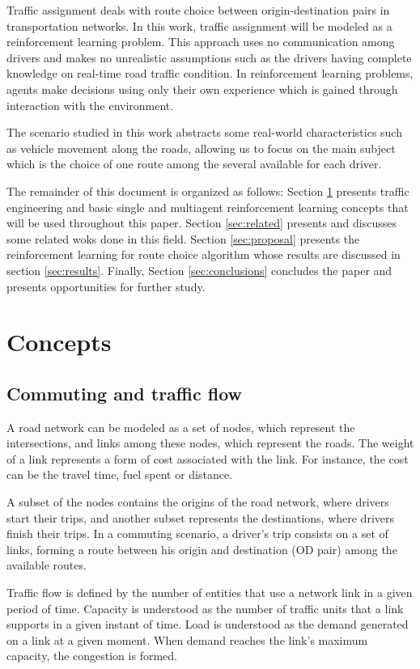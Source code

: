 \documentclass[12pt]{article}
\begin{document}
Traffic assignment deals with route choice between origin-destination pairs in transportation networks. In this work, traffic assignment will be modeled as a reinforcement learning problem. This approach uses no communication among drivers and makes no unrealistic assumptions such as the drivers having complete knowledge on real-time road traffic condition. In reinforcement learning problems, agents make decisions using only their own experience which is gained through interaction with the environment.

The scenario studied in this work abstracts some real-world characteristics such as vehicle movement along the roads, allowing us to focus on the main subject which is the choice of one route among the several available for each driver.

The remainder of this document is organized as follows: Section \ref{sec:concepts} presents traffic engineering and basic single and multiagent reinforcement learning concepts that will be used throughout this paper. Section \ref{sec:related} presents and discusses some related woks done in this field. Section \ref{sec:proposal} presents the reinforcement learning for route choice algorithm whose results are discussed in section \ref{sec:results}. Finally, Section \ref{sec:conclusions} concludes the paper and presents opportunities for further study.

\section{Concepts}
\label{sec:concepts}
\subsection{Commuting and traffic flow}

A road network can be modeled as a set of nodes, which represent the intersections, and links among these nodes, which represent the roads. The weight of a link represents a form of cost associated with the link. For instance, the cost can be the travel time, fuel spent or distance.

A subset of the nodes contains the origins of the road network, where drivers start their trips, and another subset represents the destinations, where drivers finish their trips. In a commuting scenario, a driver's trip consists on a set of links, forming a route between his origin and destination (OD pair) among the available routes.

Traffic flow is defined by the number of entities that use a network link in a given period of time. Capacity is understood as the number of traffic units that a link supports in a given instant of time. Load is understood as the demand generated on a link at a given moment. When demand reaches the link's maximum capacity, the congestion is formed.
\end{document}
